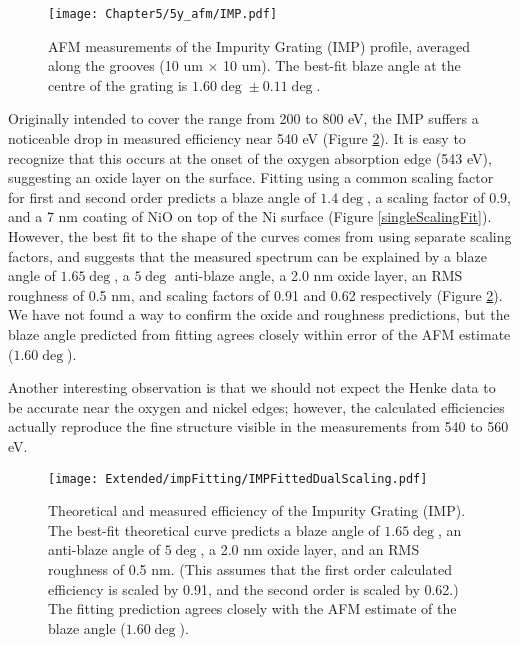 \begin{figure}[htbp] %
   \centering
   \texttt{[image: Chapter5/5y\_afm/IMP.pdf]} 
   \caption{AFM measurements of the Impurity Grating (IMP) profile, averaged along the grooves (10 um $\times$ 10 um).  The best-fit blaze angle at the centre of the grating is $1.60\deg \pm 0.11\deg$.}
   \label{5y-imp}
\end{figure}

Originally intended to cover the range from 200 to 800 eV, the IMP suffers a noticeable drop in measured efficiency near 540 eV (Figure \ref{5x-imp}).  It is easy to recognize that this occurs at the onset of the oxygen absorption edge (543 eV), suggesting an oxide layer on the surface.  Fitting using a common scaling factor for first and second order predicts a blaze angle of $1.4\deg$, a scaling factor of 0.9, and a 7 nm coating of NiO on top of the Ni surface (Figure \ref{singleScalingFit}).  However, the best fit to the shape of the curves comes from using separate scaling factors, and suggests that the measured spectrum can be explained by a blaze angle of $1.65\deg$, a $5\deg$ anti-blaze angle, a 2.0 nm oxide layer, an RMS roughness of 0.5 nm, and scaling factors of 0.91 and 0.62 respectively (Figure \ref{5x-imp}).  We have not found a way to confirm the oxide and roughness predictions, but the blaze angle predicted from fitting agrees closely within error of the AFM estimate ($1.60\deg$).

Another interesting observation is that we should not expect the Henke data to be accurate near the oxygen and nickel edges; however, the calculated efficiencies actually reproduce the fine structure visible in the measurements from 540 to 560 eV.

\begin{figure}[htbp] %
   \centering
   \texttt{[image: Extended/impFitting/IMPFittedDualScaling.pdf]} 
   \caption{Theoretical and measured efficiency of the Impurity Grating (IMP).  The best-fit theoretical curve predicts a blaze angle of $1.65\deg$, an anti-blaze angle of $5\deg$, a 2.0 nm oxide layer, and an RMS roughness of 0.5 nm.  (This assumes that the first order calculated efficiency is scaled by 0.91, and the second order is scaled by 0.62.)  The fitting prediction agrees closely with the AFM estimate of the blaze angle ($1.60\deg$).}
   \label{5x-imp}
\end{figure}

